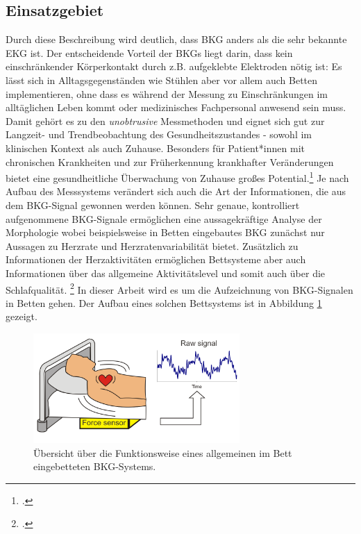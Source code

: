 	\subsection{Einsatzgebiet}
	
	Durch diese Beschreibung wird deutlich, dass \ac{BKG} anders als die sehr bekannte \ac{EKG} ist. Der entscheidende Vorteil der \ac{BKG}s liegt darin, dass kein einschränkender Körperkontakt durch z.B. aufgeklebte Elektroden nötig ist: Es lässt sich in Alltagsgegenständen wie Stühlen aber vor allem auch Betten implementieren, ohne dass es während der Messung zu Einschränkungen im alltäglichen Leben kommt oder medizinisches Fachpersonal anwesend sein muss. Damit gehört es zu den \textit{unobtrusive} Messmethoden und eignet sich gut zur Langzeit- und Trendbeobachtung des Gesundheitszustandes - sowohl im klinischen Kontext als auch Zuhause. Besonders für Patient*innen mit chronischen Krankheiten und zur Früherkennung krankhafter Veränderungen bietet eine gesundheitliche Überwachung von Zuhause großes Potential.\footcite[Vgl.][]{Inan2015} Je nach Aufbau des Messsystems verändert sich auch die Art der Informationen, die aus dem \ac{BKG}-Signal gewonnen werden können. Sehr genaue, kontrolliert aufgenommene \ac{BKG}-Signale ermöglichen eine aussagekräftige Analyse der Morphologie wobei beispielsweise in Betten eingebautes \ac{BKG} zunächst nur Aussagen zu Herzrate und Herzratenvariabilität bietet. Zusätzlich zu Informationen der Herzaktivitäten ermöglichen Bettsysteme aber auch Informationen über das allgemeine Aktivitätslevel und somit auch über die Schlafqualität. \footcite[Vgl.][]{Bruser2011} In dieser Arbeit wird es um die Aufzeichnung von \ac{BKG}-Signalen in Betten gehen. Der Aufbau eines solchen Bettsystems ist in Abbildung \ref{fig:bcgbed} gezeigt.
	
	 \begin{figure}[H]
	 	\centering
		\includegraphics[width=0.7\textwidth]{pic/bcgBed.png}
		\caption[Übersicht über die Funktionsweise eines allgemeinen im Bett eingebetteten \ac{BKG}-Systems]{Übersicht über die Funktionsweise eines allgemeinen im Bett eingebetteten \ac{BKG}-Systems.\protect\footnotemark}
		\label{fig:bcgbed}
	\end{figure}
	

